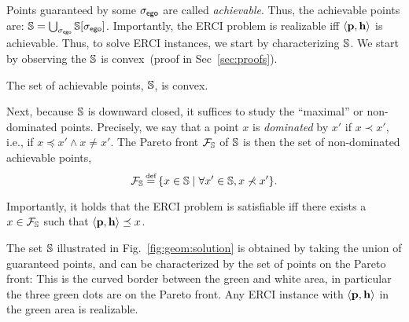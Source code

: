 Points guaranteed by some ${\sigma_{\mathsf{ego}}}$ are called
\emph{achievable}. Thus, the achievable points are: $ \mathbb{S} =
\bigcup_{{\sigma_{\mathsf{ego}}}} \mathbb{S}[{\sigma_{\mathsf{ego}}}]$.  Importantly, the ERCI problem is realizable iff $\langle \mathbf{p},
\mathbf{h} \rangle$ is achievable. 
Thus, to solve ERCI instances, we start by characterizing
$\mathbb{S}$. We start by observing the $\mathbb{S}$ is convex\footnotemark~(proof in Sec~\ref{sec:proofs}).


\begin{proposition}\label{prop:convex}
  The set of achievable points, $\mathbb{S}$, is convex. 
\end{proposition}


Next, because $\mathbb{S}$ is downward closed, it
suffices to study the ``maximal'' or non-dominated points.  Precisely,
we say that a point $x$ is \emph{dominated} by $x'$ if $x \prec
x'$, i.e., if $x \preceq x' \wedge x \neq x'$.
The Pareto front $\mathcal{F}_{\mathbb{S}}$ of $\mathbb{S}$ is then the set of non-dominated achievable  points,
\begin{equation}
  \pareto{\solutions} \eqdef \{ x \in \solutions \mid \forall x' \in \solutions, x \not\prec x'  \}.  
\end{equation}
\noindent
\begin{mdframed}
Importantly, it holds that the ERCI problem is satisfiable iff there exists a  $x \in \mathcal{F}_{\mathbb{S}}$ such that $\langle \mathbf{p}, \mathbf{h} \rangle \preceq x$.    
\end{mdframed}
\begin{example}
	The set $\mathbb{S}$ illustrated in Fig.~\ref{fig:geom:solution} is obtained by taking the union of guaranteed points, and can be characterized by the set of points on the Pareto front: This is the curved border between the green and white area, in particular the three green dots are on the Pareto front. Any ERCI instance with $\langle \mathbf{p}, \mathbf{h} \rangle$ in the green area is realizable.
\end{example}



